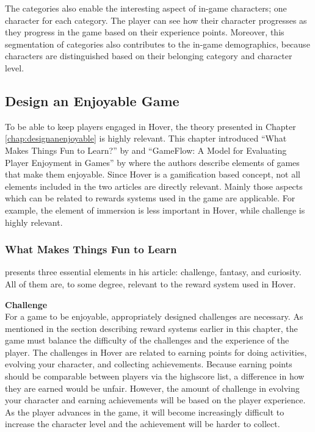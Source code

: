 \documentclass[../Main.tex]{subfiles}
\begin{document}
The categories also enable the interesting aspect of in-game characters; one character for each category. The player can see how their character progresses as they progress in the game based on their experience points. Moreover, this segmentation of categories also contributes to the in-game demographics, because characters are distinguished based on their belonging category and character level.

\subsection{Design an Enjoyable Game}
To be able to keep players engaged in Hover, the theory presented in Chapter \ref{chap:designanenjoyable} is highly relevant. This chapter introduced “What Makes Things Fun to Learn?” by \citeauthor{malone_what_1980} and “GameFlow: A Model for Evaluating Player Enjoyment in Games” by \citeauthor{sweetser_gameflow_2005} where the authors describe elements of games that make them enjoyable. Since Hover is a gamification based concept, not all elements included in the two articles are directly relevant. Mainly those aspects which can be related to rewards systems used in the game are applicable. For example, the element of immersion is less important in Hover, while challenge is highly relevant.

\subsubsection{What Makes Things Fun to Learn}
\citeauthor{malone_what_1980} presents three essential elements in his article: challenge, fantasy, and curiosity. All of them are, to some degree, relevant to the reward system used in Hover.

\textbf{Challenge}\\
For a game to be enjoyable, appropriately designed challenges are necessary. As mentioned in the section describing reward systems earlier in this chapter, the game must balance the difficulty of the challenges and the experience of the player. The challenges in Hover are related to earning points for doing activities, evolving your character, and collecting achievements. Because earning points should be comparable between players via the highscore list, a difference in how they are earned would be unfair. However, the amount of challenge in evolving your character and earning achievements will be based on the player experience. As the player advances in the game, it will become increasingly difficult to increase the character level and the achievement will be harder to collect. 
\end{document}
